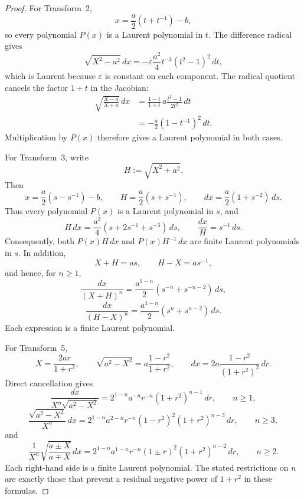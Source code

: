 \documentclass[10pt,a4paper]{amsart}
\begin{document}
\begin{proof}
For Transform~2,
\[
x=\frac{a}{2}\left(t+t^{-1}\right)-b,
\]
so every polynomial $P(x)$ is a Laurent polynomial in $t$. The difference radical gives
\[
\sqrt{X^2-a^2}\,dx
=-\varepsilon\frac{a^2}{4}t^{-3}(t^2-1)^2\,dt,
\]
which is Laurent because $\varepsilon$ is constant on each component. The radical quotient cancels the factor $1+t$ in the Jacobian:
\begin{align*}
\sqrt{\frac{X-a}{X+a}}\,dx
&=\frac{1-t}{1+t}\,a\frac{t^2-1}{2t^2}\,dt\\
&=-\frac{a}{2}\left(1-t^{-1}\right)^2\,dt.
\end{align*}
Multiplication by $P(x)$ therefore gives a Laurent polynomial in both cases.

For Transform~3, write
\[
H:=\sqrt{X^2+a^2}.
\]
Then
\[
x=\frac{a}{2}\left(s-s^{-1}\right)-b,
\qquad
H=\frac{a}{2}\left(s+s^{-1}\right),
\qquad
dx=\frac{a}{2}\left(1+s^{-2}\right)\,ds.
\]
Thus every polynomial $P(x)$ is a Laurent polynomial in $s$, and
\[
H\,dx=\frac{a^2}{4}\left(s+2s^{-1}+s^{-3}\right)\,ds,
\qquad
\frac{dx}{H}=s^{-1}\,ds.
\]
Consequently, both $P(x)H\,dx$ and $P(x)H^{-1}\,dx$ are finite Laurent polynomials in $s$. In addition,
\[
X+H=as,
\qquad
H-X=as^{-1},
\]
and hence, for $n\ge1$,
\[
\frac{dx}{(X+H)^n}
=\frac{a^{1-n}}{2}\left(s^{-n}+s^{-n-2}\right)\,ds,
\]
\[
\frac{dx}{(H-X)^n}
=\frac{a^{1-n}}{2}\left(s^n+s^{n-2}\right)\,ds.
\]
Each expression is a finite Laurent polynomial.

For Transform~5,
\[
X=\frac{2ar}{1+r^2},
\qquad
\sqrt{a^2-X^2}=a\frac{1-r^2}{1+r^2},
\qquad
dx=2a\frac{1-r^2}{(1+r^2)^2}\,dr.
\]
Direct cancellation gives
\[
\frac{dx}{X^n\sqrt{a^2-X^2}}
=2^{1-n}a^{-n}r^{-n}(1+r^2)^{n-1}\,dr,
\qquad n\ge1,
\]
\[
\frac{\sqrt{a^2-X^2}}{X^n}\,dx
=2^{1-n}a^{2-n}r^{-n}(1-r^2)^2(1+r^2)^{n-3}\,dr,
\qquad n\ge3,
\]
and
\[
\frac{1}{X^n}\sqrt{\frac{a\pm X}{a\mp X}}\,dx
=2^{1-n}a^{1-n}r^{-n}(1\pm r)^2(1+r^2)^{n-2}\,dr,
\qquad n\ge2.
\]
Each right-hand side is a finite Laurent polynomial. The stated restrictions on $n$ are exactly those that prevent a residual negative power of $1+r^2$ in these formulas.
\end{proof}
\end{document}
